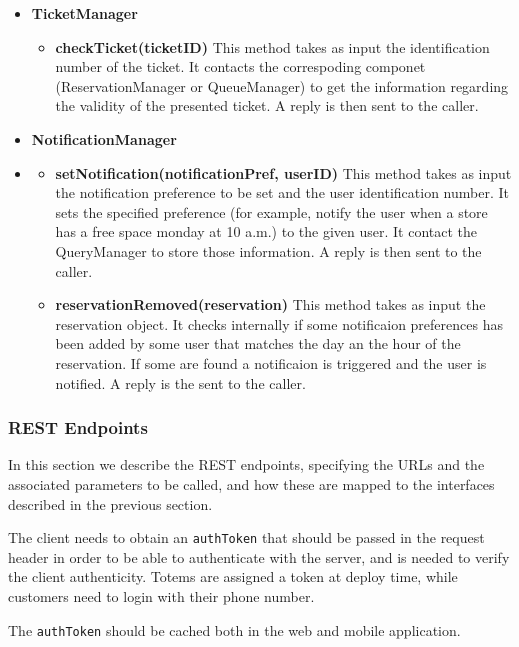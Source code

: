 \begin{itemize}
    \item \textbf{TicketManager}
    \begin{itemize}
        \item \textbf{checkTicket(ticketID)}
        This method takes as input the identification number of the ticket. It contacts the correspoding componet (ReservationManager or QueueManager) to get the information regarding the validity of the presented ticket. A reply is then sent to the caller.
    \end{itemize}

    \item \textbf{NotificationManager}
    \item \begin{itemize}
        \item \textbf{setNotification(notificationPref, userID)}
        This method takes as input the notification preference to be set and the user identification number. It sets the specified preference (for example, notify the user when a store has a free space monday at 10 a.m.) to the given user. It contact the QueryManager to store those information. A reply is then sent to the caller. 
        \item \textbf{reservationRemoved(reservation)}
        This method takes as input the reservation object. It checks internally if some notificaion preferences has been added by some user that matches the day an the hour of the reservation. 
        If some are found a notificaion is triggered and the user is notified. A reply is the sent to the caller.
    \end{itemize}
\end{itemize}

\subsubsection{REST Endpoints}

In this section we describe the REST endpoints, specifying the URLs and the associated parameters to be called, and how these are mapped to the interfaces described in the previous section.

The client needs to obtain an \texttt{authToken} that should be passed in the request header in order to be able to authenticate with the server, and is needed to verify the client authenticity.
Totems are assigned a token at deploy time, while customers need to login with their phone number.

The \texttt{authToken} should be cached both in the web and mobile application.

